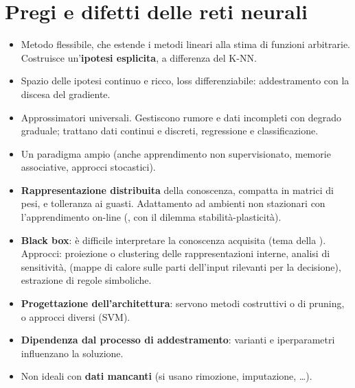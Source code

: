 \section{Pregi e difetti delle reti neurali}

\begin{idea}[Pregi]
\begin{itemize}
  \item Metodo flessibile, che estende i metodi lineari alla stima di funzioni arbitrarie. Costruisce
        un'\textbf{ipotesi esplicita}, a differenza del K-NN.
  \item Spazio delle ipotesi continuo e ricco, loss differenziabile: addestramento con la discesa del gradiente.
  \item Approssimatori universali. Gestiscono rumore e dati incompleti con degrado graduale; trattano dati
        continui e discreti, regressione e classificazione.
  \item Un paradigma ampio (anche apprendimento non supervisionato, memorie associative, approcci stocastici).
  \item \textbf{Rappresentazione distribuita} della conoscenza, compatta in matrici di pesi, e tolleranza ai
        guasti. Adattamento ad ambienti non stazionari con l'apprendimento on-line (, con
        il dilemma stabilità-plasticità).
\end{itemize}
\end{idea}

\begin{attenzione}
\begin{itemize}
  \item \textbf{Black box}: è difficile interpretare la conoscenza acquisita (tema della ).
        Approcci: proiezione o clustering delle rappresentazioni interne, analisi di sensitività,
         (mappe di calore sulle parti dell'input rilevanti per la
        decisione), estrazione di regole simboliche.
  \item \textbf{Progettazione dell'architettura}: servono metodi costruttivi o di pruning, o approcci diversi (SVM).
  \item \textbf{Dipendenza dal processo di addestramento}: varianti e iperparametri influenzano la soluzione.
  \item Non ideali con \textbf{dati mancanti} (si usano rimozione, imputazione, \dots).
\end{itemize}
\end{attenzione}

